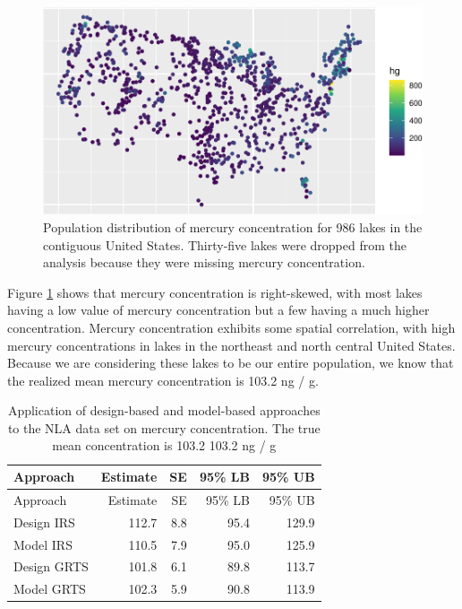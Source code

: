 \documentclass[]{elsarticle} %
\begin{document}
\begin{figure}
\includegraphics[width=1\linewidth]{SpatialDVM_Manuscript_files/figure-latex/figdata-1} \caption{Population distribution of mercury concentration for 986 lakes in the contiguous United States. Thirty-five lakes were dropped from the analysis because they were missing mercury concentration.}\label{fig:figdata}
\end{figure}

Figure \ref{fig:figdata} shows that mercury concentration is
right-skewed, with most lakes having a low value of mercury
concentration but a few having a much higher concentration. Mercury
concentration exhibits some spatial correlation, with high mercury
concentrations in lakes in the northeast and north central United
States. Because we are considering these lakes to be our entire
population, we know that the realized mean mercury concentration is
103.2 ng / g.

\begin{longtable}[]{@{}lrrrr@{}}
\caption{\label{tab:appliedtab} Application of design-based and
model-based approaches to the NLA data set on mercury concentration. The
true mean concentration is 103.2 103.2 ng / g}\tabularnewline
\toprule
Approach & Estimate & SE & 95\% LB & 95\% UB \\
\midrule
\endfirsthead
\toprule
Approach & Estimate & SE & 95\% LB & 95\% UB \\
\midrule
\endhead
Design IRS & 112.7 & 8.8 & 95.4 & 129.9 \\
Model IRS & 110.5 & 7.9 & 95.0 & 125.9 \\
Design GRTS & 101.8 & 6.1 & 89.8 & 113.7 \\
Model GRTS & 102.3 & 5.9 & 90.8 & 113.9 \\
\bottomrule
\end{longtable}
\end{document}
